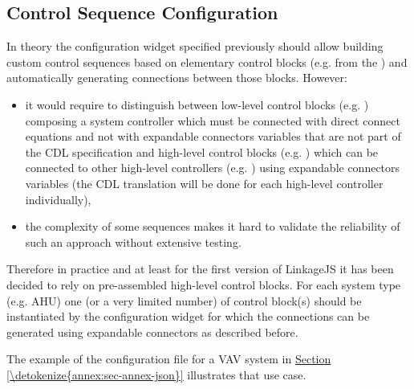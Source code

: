 \documentclass[letterpaper,10pt, openany,english]{sphinxmanual}
\begin{document}
\subsection{Control Sequence Configuration}
\label{\detokenize{requirements:control-sequence-configuration}}
In theory the configuration widget specified previously should allow building custom control sequences based on elementary control blocks (e.g. from the ) and automatically generating connections between those blocks. However:
\begin{itemize}
\item {} 
it would require to distinguish between low-level control blocks (e.g. ) composing a system controller \textendash{} which must be connected with direct connect equations and not with expandable connectors variables that are not part of the CDL specification \textendash{} and high-level control blocks (e.g. ) \textendash{} which can be connected to other high-level controllers (e.g. ) using expandable connectors variables (the CDL translation will be done for each high-level controller individually),

\item {} 
the complexity of some sequences makes it hard to validate the reliability of such an approach without extensive testing.

\end{itemize}

Therefore in practice and at least for the first version of LinkageJS it has been decided to rely on pre-assembled high-level control blocks. For each system type (e.g. AHU) one (or a very limited number) of control block(s) should be instantiated by the configuration widget for which the connections can be generated using expandable connectors as described before.

The example of the configuration file for a VAV system in \hyperref[\detokenize{annex:sec-annex-json}]{Section \ref{\detokenize{annex:sec-annex-json}}} illustrates that use case.
\end{document}
